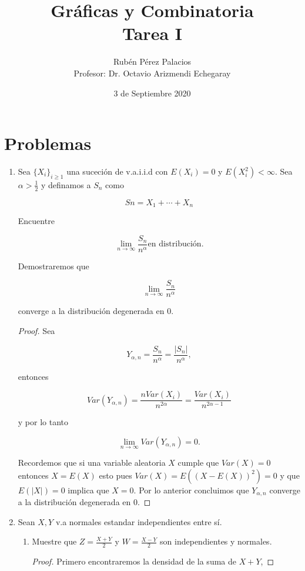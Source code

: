 \documentclass[letterpaper]{article}
\title{Gráficas y Combinatoria\\Tarea I}
\author{Rubén Pérez Palacios\\Profesor: Dr. Octavio Arizmendi Echegaray}
\date{3 de Septiembre 2020}
\theoremstyle{definition}
\theoremstyle{lemathm}
\theoremstyle{lemademthm}
\newcommand{\limninf}{\lim_{n\to\infty}}
\begin{document}
	\maketitle
    
    \section*{Problemas}

    \begin{enumerate}
        
        \item Sea $\{X_i\}_{i\geq1}$ una suceción de v.a.i.i.d con $E(X_i) = 0$ y $E(X_i^2) < \infty$. Sea $\alpha > \frac{1}{2}$ y definamos a $S_n$ como
		
		\[Sn = X_1 + \cdots + X_n\]

		Encuentre

		\[\limninf \frac{S_n}{n^\alpha} \text{en distribución}.\]

		Demostraremos que

		\[\limninf \frac{S_n}{n^\alpha}\]

		converge a la distribución degenerada en 0.

		\begin{proof}
			Sea 

			\[Y_{\alpha,n} = \frac{S_n}{n^\alpha} = \frac{|S_n|}{n^\alpha},\]
			
			entonces

			\[Var(Y_{\alpha,n}) = \frac{nVar(X_i)}{n^{2\alpha}} = \frac{Var(X_i)}{n^{2\alpha - 1}}\]

			y por lo tanto

			\[\limninf Var(Y_{\alpha,n}) = 0.\]

			Recordemos que si una variable aleatoria $X$ cumple que $Var(X) = 0$ entonces $X = E(X)$ esto pues $Var(X) = E((X - E(X))^2) = 0$ y que $E(|X|) = 0$ implica que $X=0$. Por lo anterior concluimos que $Y_{\alpha,n}$ converge a la distribución degenerada en 0.			
		\end{proof}

		\item Sean $X, Y$ v.a normales estandar independientes entre sí.
		
		\begin{enumerate}
			\item Muestre que $Z = \frac{X + Y}{2}$ y $W = \frac{X - Y}{2}$ son independientes y normales.
			
			\begin{proof}
				Primero encontraremos la densidad de la suma de $X+Y$,


\end{proof}
\end{enumerate}
\end{enumerate}
\end{document}
